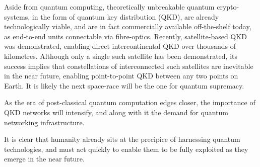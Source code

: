 Aside from quantum computing, theoretically unbreakable quantum crypto-systems, in the form of quantum key distribution (QKD), are already technologically viable, and are in fact commercially available off-the-shelf today, as end-to-end units connectable via fibre-optics. Recently, satellite-based QKD was demonstrated, enabling direct intercontinental QKD over thousands of kilometres. Although only a single such satellite has been demonstrated, its success implies that constellations of interconnected such satellites are inevitable in the near future, enabling point-to-point QKD between any two points on Earth. It is likely the next space-race will be the one for quantum supremacy.

As the era of post-classical quantum computation edges closer, the importance of QKD networks will intensify, and along with it the demand for quantum networking infrastructure.

It is clear that humanity already sits at the precipice of harnessing quantum technologies, and must act quickly to enable them to be fully exploited as they emerge in the near future.